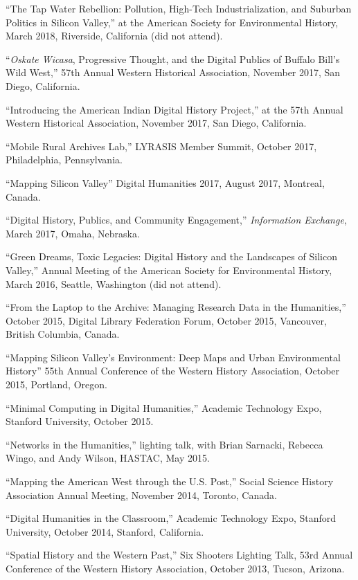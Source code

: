 ``The Tap Water Rebellion: Pollution, High-Tech Industrialization, and
Suburban Politics in Silicon Valley,'' at the American Society for
Environmental History, March 2018, Riverside, California (did not
attend).

``\emph{Oskate Wicasa}, Progressive Thought, and the Digital Publics of
Buffalo Bill's Wild West,'' 57th Annual Western Historical Association,
November 2017, San Diego, California.

``Introducing the American Indian Digital History Project,'' at the 57th
Annual Western Historical Association, November 2017, San Diego,
California.

``Mobile Rural Archives Lab,'' LYRASIS Member Summit, October 2017,
Philadelphia, Pennsylvania.

``Mapping Silicon Valley'' Digital Humanities 2017, August 2017,
Montreal, Canada.

``Digital History, Publics, and Community Engagement,''
\emph{Information Exchange}, March 2017, Omaha, Nebraska.

``Green Dreams, Toxic Legacies: Digital History and the Landscapes of
Silicon Valley,'' Annual Meeting of the American Society for
Environmental History, March 2016, Seattle, Washington (did not attend).

``From the Laptop to the Archive: Managing Research Data in the
Humanities,'' October 2015, Digital Library Federation Forum, October
2015, Vancouver, British Columbia, Canada.

``Mapping Silicon Valley's Environment: Deep Maps and Urban
Environmental History'' 55th Annual Conference of the Western History
Association, October 2015, Portland, Oregon.

``Minimal Computing in Digital Humanities,'' Academic Technology Expo,
Stanford University, October 2015.

``Networks in the Humanities,'' lighting talk, with Brian Sarnacki,
Rebecca Wingo, and Andy Wilson, HASTAC, May 2015.

``Mapping the American West through the U.S. Post,'' Social Science
History Association Annual Meeting, November 2014, Toronto, Canada.

``Digital Humanities in the Classroom,'' Academic Technology Expo,
Stanford University, October 2014, Stanford, California.

``Spatial History and the Western Past,'' Six Shooters Lighting Talk,
53rd Annual Conference of the Western History Association, October 2013,
Tucson, Arizona.

